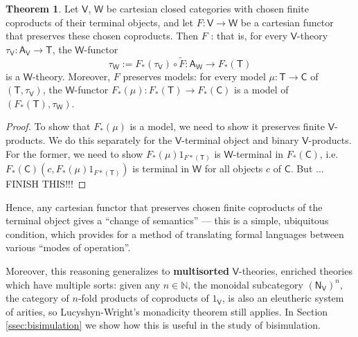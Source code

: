 \documentclass{amsart}
\newcommand{\define}[1]{{\bf \boldmath{#1}}}
\theoremstyle{definition}
\newtheorem{theorem}{Theorem}
\newcommand{\NN}{\mathsf{N}}
\newcommand{\A}{\mathsf{A}}
\newcommand{\V}{\mathsf{V}}
\newcommand{\W}{\mathsf{W}}
\newcommand{\D}{\mathsf{D}}
\newcommand{\C}{\mathsf{C}}
\newcommand{\T}{\mathsf{T}}
\newcommand{\maps}{\colon}
\begin{document}
\begin{theorem}
\label{thm:change-of-base}
Let $\V$, $\W$ be cartesian closed categories with chosen finite coproducts of their terminal objects, and let $F\maps \V \to \W$ be a cartesian functor that preserves these chosen coproducts.  Then $F$ \define{preserves enriched theories}: that is, for every $\V$-theory $\tau_\V\maps \A_\V\to \T$, the $\W$-functor 
\[ \tau_\W := F_*(\tau_\V) \circ \tilde{F} \maps \A_\W \to F_*(\T)\]
is a $\W$-theory. Moreover, $F$ preserves models: for every model $\mu \maps\T \to \C$
of $(\T,\tau_\V) $, the $\W$-functor $F_*(\mu) \maps F_*(\T) \to F_*(\C)$ is a model of 
$(F_*(\T), \tau_\W)$.
\end{theorem}

\begin{proof}
To show that $F_*(\mu)$ is a model, we need
to show it preserves finite $\V$-products.   We do this separately for the $\V$-terminal object and
binary $\V$-products.  For the former, we need to show $F_*(\mu) 1_{F*(\T)}$ is $\W$-terminal
in $F_*(\C)$, i.e.\ $F_*(\C) (c, F_*(\mu) 1_{F*(\T)}) $ is terminal in $\W$ for all objects
$c$ of $\C$.  But ...   FINISH THIS!!!

\iffalse
	\[\begin{array}{rcll}
	F_*(\D)(F_*(f)(a),F_*(f)(s^{n_\V})) & = & F(\D(f(a),f(t^{n_\V})) & \text{definition of base change}\\
	& \cong & F(\D(f(a),f(t)^{n_\V}) & f \text{ preserves } \NN_\V \text{-powers}\\
	& \cong & F(\D(f(a),f(t))^n) & \text{Lemma \ref{lem:powers_1} for } \V\\
	& \cong & F(\D(f(a),f(t)))^n & F \text{preserves $\V$-products}\\
	& = & F_*(\D)(f(a),f(t))^n & \text{definition of base change}\\
	& \cong & F_*(\D)(f(a),f(t)^{n_\W}) & \text{Lemma \ref{lem:powers_1} for } \W. \qedhere
	\end{array}\]
	\fi
\end{proof}

Hence, any cartesian functor that preserves chosen finite coproducts of the terminal object gives a ``change of semantics'' --- this is a simple, ubiquitous condition, which provides for a method of translating formal languages between various ``modes of operation''.

Moreover, this reasoning generalizes to \textbf{multisorted} $\V$-theories, enriched theories which have multiple sorts: given any $n\in \mathbb{N}$, the monoidal subcategory $(\NN_\V)^n$, the category of $n$-fold products of coproducts of $1_\V$, is also an eleutheric system of arities, so Lucyshyn-Wright's monadicity theorem still applies.   In Section \ref{ssec:bisimulation} we show how this is useful in the study of bisimulation.
\end{document}

